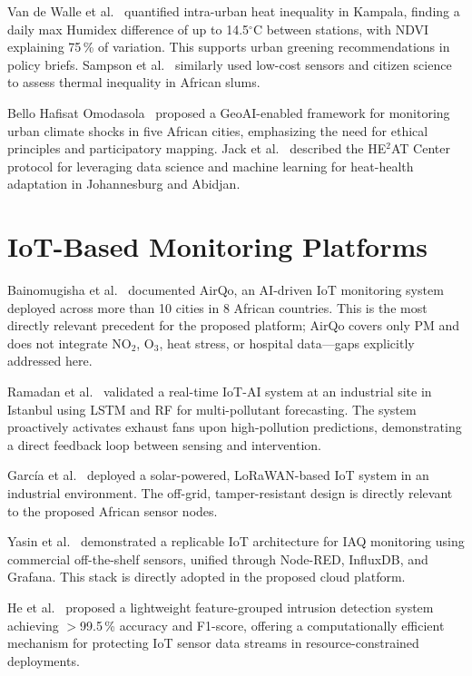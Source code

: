 Van de Walle et al.~\cite{vandewalle2021} quantified intra-urban heat inequality in Kampala, finding a daily max Humidex difference of up to 14.5$^\circ$C between stations, with NDVI explaining 75\,\% of variation. This supports urban greening recommendations in policy briefs. Sampson et al.~\cite{Sally_Ama_Sampson_2025} similarly used low-cost sensors and citizen science to assess thermal inequality in African slums.

Bello Hafisat Omodasola~\cite{Bello_Hafisat_Omodasola_2025} proposed a GeoAI-enabled framework for monitoring urban climate shocks in five African cities, emphasizing the need for ethical principles and participatory mapping. Jack et al.~\cite{Christopher_Jack_2024} described the HE$^2$AT Center protocol for leveraging data science and machine learning for heat-health adaptation in Johannesburg and Abidjan.

\section{IoT-Based Monitoring Platforms}
Bainomugisha et al.~\cite{bainomugisha2024} documented AirQo, an AI-driven IoT monitoring system deployed across more than 10 cities in 8 African countries. This is the most directly relevant precedent for the proposed platform; AirQo covers only PM and does not integrate NO$_2$, O$_3$, heat stress, or hospital data—gaps explicitly addressed here.

Ramadan et al.~\cite{ramadan2024} validated a real-time IoT-AI system at an industrial site in Istanbul using LSTM and RF for multi-pollutant forecasting. The system proactively activates exhaust fans upon high-pollution predictions, demonstrating a direct feedback loop between sensing and intervention.

Garc{\'i}a et al.~\cite{garcia2022smart} deployed a solar-powered, LoRaWAN-based IoT system in an industrial environment. The off-grid, tamper-resistant design is directly relevant to the proposed African sensor nodes.

Yasin et al.~\cite{yasin2022} demonstrated a replicable IoT architecture for IAQ monitoring using commercial off-the-shelf sensors, unified through Node-RED, InfluxDB, and Grafana. This stack is directly adopted in the proposed cloud platform.

He et al.~\cite{he2024} proposed a lightweight feature-grouped intrusion detection system achieving $>$99.5\,\% accuracy and F1-score, offering a computationally efficient mechanism for protecting IoT sensor data streams in resource-constrained deployments.

